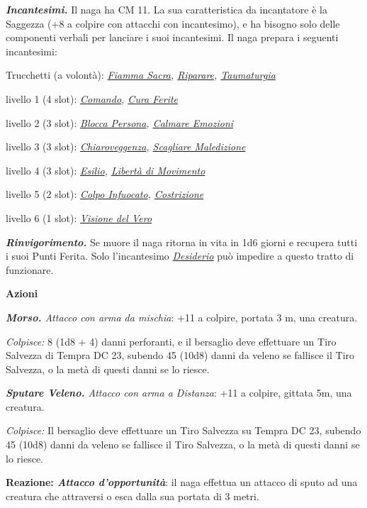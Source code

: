 \begin{multicols}{2}
{\emph{\textbf{Incantesimi.}} Il naga ha CM 11. La sua caratteristica da incantatore è la Saggezza (+8 a colpire con attacchi con incantesimo), e ha bisogno solo delle componenti verbali per lanciare i suoi incantesimi. Il naga prepara i seguenti incantesimi:

Trucchetti (a volontà): \emph{\hyperlink{Fiamma Sacra}{Fiamma Sacra}, \hyperlink{Riparare}{Riparare}, \hyperlink{Taumaturgia}{Taumaturgia}}

livello 1 (4 slot): \emph{\hyperlink{Comando}{Comando}, \hyperlink{Cura Ferite}{Cura Ferite}}

livello 2 (3 slot): \emph{\hyperlink{Blocca Persona}{Blocca Persona}, \hyperlink{Calmare Emozioni}{Calmare Emozioni}}

livello 3 (3 slot): \emph{\hyperlink{Chiaroveggenza}{Chiaroveggenza}, \hyperlink{Scagliare Maledizione}{Scagliare Maledizione}}

livello 4 (3 slot): \emph{\hyperlink{Esilio}{Esilio}, \hyperlink{Libertà di Movimento}{Libertà di Movimento}}

livello 5 (2 slot): \emph{\hyperlink{Colpo Infuocato}{Colpo Infuocato}, \hyperlink{Costrizione}{Costrizione}}

livello 6 (1 slot): \emph{\hyperlink{Visione del Vero}{Visione del Vero}}

\emph{\textbf{Rinvigorimento.}} Se muore il naga ritorna in vita in 1d6 giorni e recupera tutti i suoi Punti Ferita. Solo l'incantesimo \emph{\hyperlink{Desiderio}{Desiderio}} può impedire a questo tratto di funzionare.

\textbf{Azioni}

\emph{\textbf{Morso.} Attacco con arma da mischia}: +11 a colpire, portata 3 m, una creatura.

\emph{Colpisce:} 8 (1d8 + 4) danni perforanti, e il bersaglio deve effettuare un Tiro Salvezza di Tempra DC 23, subendo 45 (10d8) danni da veleno se fallisce il Tiro Salvezza, o la metà di questi danni se lo riesce.

\emph{\textbf{Sputare Veleno.} Attacco con arma a Distanza}: +11 a colpire, gittata 5m, una creatura.

\emph{Colpisce:} Il bersaglio deve effettuare un Tiro Salvezza su Tempra DC 23, subendo 45 (10d8) danni da veleno se fallisce il Tiro Salvezza, o la metà di questi danni se lo riesce.

\textbf{Reazione: \emph{Attacco d'opportunità}}: il naga effettua un attacco di sputo ad una creatura che attraversi o esca dalla sua portata di 3 metri.

}
\end{multicols}
